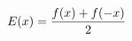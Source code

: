 \documentclass[preview]{standalone}
\begin{document}
\begin{align*}
\special{dvisvgm:raw <g id='unique000'>}E(x)=\frac{f(x)+f(-x)}{2}\special{dvisvgm:raw </g>}
\end{align*}
\end{document}
